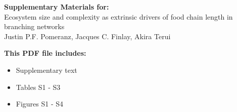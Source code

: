 \begin{center}
\LARGE{\textbf{Supplementary Materials for:}}\\[7.5mm]
\LARGE{Ecosystem size and complexity as extrinsic drivers of food chain length in branching networks}\\[7.5mm]
\large{Justin P.F. Pomeranz, Jacques C. Finlay, Akira Terui}\\[7.5mm]
\end{center}
\begin{flushleft}
\textbf{This PDF file includes:}
\begin{itemize}
\item Supplementary text
\item Tables S1 - S3
\item Figures S1 - S4
\end{itemize}
\end{flushleft}

\newpage
